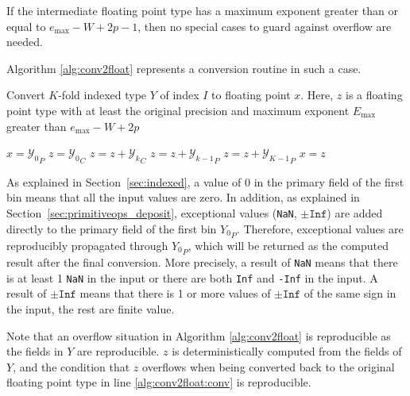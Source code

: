     If the intermediate floating point type has a maximum exponent greater than
    or equal to $e_{\max} - W + 2  p - 1$, then no special cases to guard
    against overflow are needed.

    Algorithm \ref{alg:conv2float} represents a conversion routine in such a case.

    \begin{samepage}
    \begin{alg}
      Convert $K$-fold indexed type $Y$ of index $I$ to floating point $x$.
      Here, $z$ is a floating point type with at least the original precision
      and maximum exponent $E_{\max}$ greater than $e_{\max} - W + 2  p$
      \begin{algorithmic}[1]
            \State $x = {\mathcal{Y}_0}_P$
            \State \Return
          \EndIf
          \State $z = {\mathcal{Y}_0}_C$
            \State $z = z + {\mathcal{Y}_k}_C$
            \State $z = z + {\mathcal{Y}_{k - 1}}_P$
          \EndFor
          \State $z = z + {\mathcal{Y}_{K - 1}}_P$
          \State $x = z$ \label{alg:conv2float:conv}
        \EndFunction
      \end{algorithmic}
      \label{alg:conv2float}
    \end{alg}
    \end{samepage}

    As explained in Section~\ref{sec:indexed}, a value of $0$ in the primary field
    of the first bin means that all the input values are zero.
    In addition, as explained in Section~\ref{sec:primitiveops_deposit}, exceptional values
    (\texttt{NaN}, $\pm \texttt{Inf}$) are added directly to the primary field
    of the first bin ${Y_0}_P$. Therefore, exceptional values are reproducibly
    propagated through ${Y_0}_P$, which will be returned as the computed
    result after the final conversion.
    More precisely, a result of \texttt{NaN} means that there is at least
    1 \texttt{NaN} in the input or there are both \texttt{Inf} and \texttt{-Inf}
    in the input. A result of $\pm \texttt{Inf}$ means that there is 
    1 or more values of $\pm \texttt{Inf}$ of the same sign in the input,
    the rest are finite value.

    Note that an overflow situation in Algorithm \ref{alg:conv2float} is
    reproducible as the fields in $Y$ are reproducible. $z$ is
    deterministically computed from the fields of $Y$, and the condition that
    $z$ overflows when being converted back to the original floating point type
    in line \ref{alg:conv2float:conv} is reproducible.

